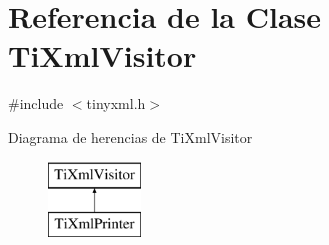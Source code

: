 \hypertarget{class_ti_xml_visitor}{\section{Referencia de la Clase Ti\-Xml\-Visitor}
\label{class_ti_xml_visitor}
}


{\ttfamily \#include $<$tinyxml.\-h$>$}

Diagrama de herencias de Ti\-Xml\-Visitor\begin{figure}[H]
\begin{center}
\leavevmode
\includegraphics[height=2.000000cm]{class_ti_xml_visitor}
\end{center}
\end{figure}
